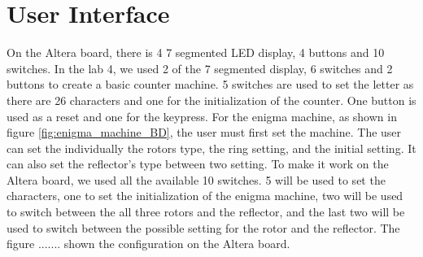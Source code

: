 \documentclass[10pt]{article}
\begin{document}
\section{User Interface}
On the Altera board, there is 4 7 segmented LED display, 4 buttons and 10 switches. In the lab 4, we used 2 of the 7 segmented display, 6 switches and 2 buttons to create a basic counter machine. 5 switches are used to set the letter as there are 26 characters and one for the initialization of the counter. One button is used as a reset and one for the keypress. For the enigma machine, as shown in figure \ref{fig:enigma_machine_BD}, the user must first set the machine. The user can set the individually the rotors type, the ring setting, and the initial setting. It can also set the reflector's type between two setting. To make it work on the Altera board, we used all the available 10 switches. 5 will be used to set the characters, one to set the initialization of the enigma machine, two will be used to switch between the all three rotors and the reflector, and the last two will be used to switch between the possible setting for the rotor and the reflector. The figure ....... shown the configuration on the Altera board.
\end{document}
